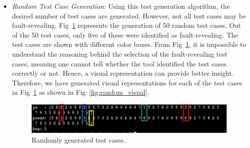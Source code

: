 \begin{itemize}
	\item \textit{Random Test Case Generation:} Using this test generation algorithm, the desired number of test cases are generated. However, not all test cases may be fault-revealing. Fig~\ref{fig:random} represents the generation of 50 random test cases. Out of the 50 test cases, only five of these were identified as fault-revealing. The test cases are shown with different color boxes. From Fig~\ref{fig:random}, it is impossible to understand the reasoning behind the selection of the fault-revealing test cases, meaning one cannot tell whether the tool identified the test cases correctly or not. Hence, a visual representation can provide better insight. Therefore, we have generated visual representations for each of the test cases in Fig~\ref{fig:random} as shown in Fig~\ref{fig:random_visual}. %
	\begin{figure}[h]
		\includegraphics[width=\linewidth]{Fig/random.png}
		\caption{Randomly generated test cases.}
		\label{fig:random}
	\end{figure}


\end{itemize}
